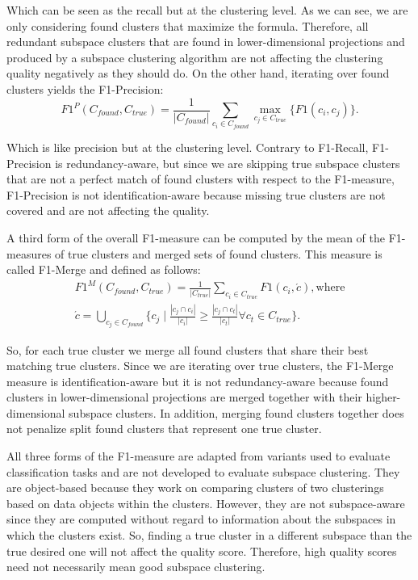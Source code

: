 Which can be seen as the recall but at the clustering level. As we can see, we are only considering found clusters that maximize the formula. Therefore, all redundant subspace clusters that are found in lower-dimensional projections and produced by a subspace clustering algorithm are not affecting the clustering quality negatively as they should do. On the other hand, iterating over found clusters yields the F1-Precision:
\begin{equation}
F1^{P}(C_{found},C_{true}) = \frac{1}{|C_{found}|} \sum _{c_{i}\in C_{found}} \max _{c_{j}\in C_{true}} \{F1(c_{i},c_{j})\}.
\end{equation}

Which is like precision but at the clustering level. Contrary to F1-Recall, F1-Precision is redundancy-aware, but since we are skipping true subspace clusters that are not a perfect match of found clusters with respect to the F1-measure, F1-Precision is not identification-aware because missing true clusters are not covered and are not affecting the quality.

A third form of the overall F1-measure can be computed by the mean of the F1-measures of true clusters and merged sets of found clusters. This measure is called F1-Merge and defined as follows:
\begin{equation}
\begin{multlined}
F1^{M}(C_{found},C_{true}) = \frac{1}{|C_{true}|} \sum _{c_{i}\in C_{true}} F1(c_{i},\acute{c}), \textrm{where}\\
\acute{c} = \bigcup _{c_{j}\in C_{found}} \Biggl\{c_{j} \mid \frac{|c_{j} \cap c_{i}|}{|c_{i}|} \geq \frac{|c_{j} \cap c_{t}|}{|c_{t}|} \forall  c_{t} \in C_{true} \Biggl\}.
\end{multlined}
\end{equation}

So, for each true cluster we merge all found clusters that share their best matching true clusters. Since we are iterating over true clusters, the F1-Merge measure is identification-aware but it is not redundancy-aware because found clusters in lower-dimensional projections are merged together with their higher-dimensional subspace clusters. In addition, merging found clusters together does not penalize split found clusters that represent one true cluster.

All three forms of the F1-measure are adapted from variants used to evaluate classification tasks and are not developed to evaluate subspace clustering. They are object-based because they work on comparing clusters of two clusterings based on data objects within the clusters. However, they are not subspace-aware since they are computed without regard to information about the subspaces in which the clusters exist. So, finding a true cluster in a different subspace than the true desired one will not affect the quality score. Therefore, high quality scores need not necessarily mean good subspace clustering. 

